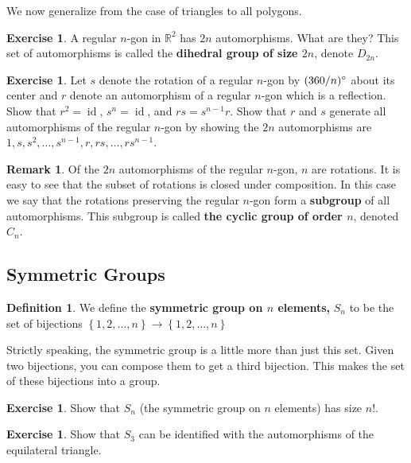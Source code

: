 \documentclass[reqno, 12pt, letter]{article}
\theoremstyle{plain}
\theoremstyle{definition}
\newtheorem{definition}[theorem]{Definition}
\newtheorem{remark}[theorem]{Remark}
\newtheorem{exercise}[theorem]{Exercise}
\theoremstyle{remark}
\numberwithin{equation}{section}
\newcommand\br{{\mathbb R}}
\newcommand \ra{\rightarrow}
\DeclareMathOperator\id{id}
\newcommand{\hint}[1]{\footnote{{Hint:} #1\hfill}}
\let\footnote=\endnote
\begin{document}
We now generalize from the case of triangles to all polygons.
\begin{exercise}
	\label{exercise:}
	A regular $n$-gon in $\br^2$ has $2n$ automorphisms. What are they?
	This set of automorphisms is called the {\bf dihedral group of size $2n$}, denote $D_{2n}$.
\end{exercise}
\begin{exercise}
	\label{exercise:}
	Let $s$ denote the rotation of a regular $n$-gon by $(360/n) \degree$ about its center and $r$ denote an automorphism of a regular $n$-gon
	which is a reflection. Show that $r^2 = \id$, $s^n = \id$, and $rs = s^{n-1} r$. Show that $r$ and $s$ generate all automorphisms of the
	regular $n$-gon by showing the $2n$ automorphisms are $1, s, s^2, \ldots, s^{n-1}, r, rs, \ldots, rs^{n-1}$.
\end{exercise}
\begin{remark}
	\label{remark:}
	Of the $2n$ automorphisms of the regular $n$-gon, $ n$ are rotations.
	It is easy to see that the subset of rotations is closed under composition.
	In this case we say that the rotations preserving the regular $n$-gon
	form a {\bf subgroup} of all automorphisms.
	This subgroup is called {\bf the cyclic group of order $n$}, denoted $C_n$.
\end{remark}

\subsection{Symmetric Groups}
\begin{definition}
	\label{definition:}
	We define the {\bf symmetric group on $n$ elements,} $S_n$ to be the set of bijections $\left\{ 1,2,\ldots, n \right\} \ra \left\{ 1, 2, \ldots, n \right\}$
\end{definition}
Strictly speaking, the symmetric group is a little more than just this set. Given two bijections, you can compose them to get a third bijection.
This makes the set of these bijections into a group.
\begin{exercise}
	\label{exercise:}
	Show that $S_n$ (the symmetric group on $n$ elements) has size $n!$.
\end{exercise}
\begin{exercise}
	\label{exercise:}
	Show that $S_3$ can be identified with the automorphisms of the equilateral triangle.
\end{exercise}
\end{document}
